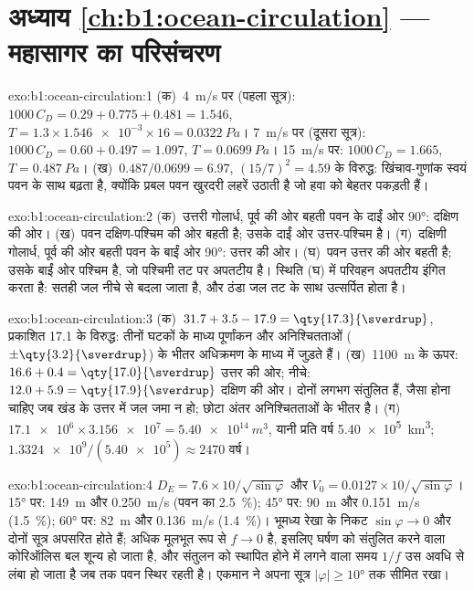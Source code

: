 \section*{अध्याय \ref{ch:b1:ocean-circulation} --- महासागर का परिसंचरण}

\begin{solution}{exo:b1:ocean-circulation:1}
(क)~\qty{4}{m/s} पर (पहला सूत्र): $1000\,C_D = 0.29 + 0.775 + 0.481 = 1.546$,
$T = 1.3 \times \num{1.546e-3} \times 16 = \qty{0.0322}{Pa}$। \qty{7}{m/s} पर (दूसरा सूत्र): $1000\,C_D = 0.60 + 0.497 = 1.097$, $T = \qty{0.0699}{Pa}$। \qty{15}{m/s} पर: $1000\,C_D = 1.665$, $T = \qty{0.487}{Pa}$। (ख)~$0.487/0.0699 =
6.97$, $(15/7)^2 = 4.59$ के विरुद्ध: खिंचाव-गुणांक स्वयं पवन के साथ बढ़ता है, क्योंकि प्रबल पवन खुरदरी लहरें उठाती है जो हवा को बेहतर पकड़ती हैं।
\end{solution}

\begin{solution}{exo:b1:ocean-circulation:2}
(क)~उत्तरी गोलार्ध, पूर्व की ओर बहती पवन के दाईं ओर \ang{90}: दक्षिण की ओर। (ख)~पवन दक्षिण-पश्चिम की ओर बहती है; उसके दाईं ओर उत्तर-पश्चिम है। (ग)~दक्षिणी गोलार्ध, पूर्व की ओर बहती पवन के बाईं ओर \ang{90}: उत्तर की ओर। (घ)~पवन उत्तर की ओर बहती है; उसके बाईं ओर पश्चिम है, जो पश्चिमी तट पर अपतटीय है। स्थिति (घ) में परिवहन अपतटीय इंगित करता है: सतही जल नीचे से बदला जाता है, और ठंडा जल तट के साथ उत्सर्पित होता है।
\end{solution}

\begin{solution}{exo:b1:ocean-circulation:3}
(क)~$31.7 + 3.5 - 17.9 = \qty{17.3}{\sverdrup}$, प्रकाशित \qty{17.1}{\sverdrup} के विरुद्ध: तीनों घटकों के माध्य पूर्णांकन और अनिश्चितताओं ($\pm\qty{3.2}{\sverdrup}$) के भीतर अधिक्रमण के माध्य में जुड़ते हैं। (ख)~\qty{1100}{m} के ऊपर: $16.6 + 0.4 = \qty{17.0}{\sverdrup}$ उत्तर की ओर; नीचे: $12.0 + 5.9 = \qty{17.9}{\sverdrup}$ दक्षिण की ओर। दोनों लगभग संतुलित हैं, जैसा होना चाहिए जब खंड के उत्तर में जल जमा न हो; छोटा अंतर अनिश्चितताओं के भीतर है। (ग)~$\num{17.1e6} \times \num{3.156e7} = \qty{5.40e14}{m^3}$, यानी प्रति वर्ष \qty{5.40e5}{km^3}; $\num{1.3324e9}/(\num{5.40e5}) \approx 2470$ वर्ष।
\end{solution}

\begin{solution}{exo:b1:ocean-circulation:4}
$D_E = 7.6 \times 10/\sqrt{\sin\varphi}$ और $V_0 = 0.0127 \times
10/\sqrt{\sin\varphi}$। \ang{15} पर: \qty{149}{m} और \qty{0.250}{m/s}
(पवन का \qty{2.5}{\percent}); \ang{45} पर: \qty{90}{m} और \qty{0.151}{m/s}
(\qty{1.5}{\percent}); \ang{60} पर: \qty{82}{m} और \qty{0.136}{m/s}
(\qty{1.4}{\percent})। भूमध्य रेखा के निकट $\sin\varphi \to 0$ और दोनों सूत्र अपसरित होते हैं; अधिक मूलभूत रूप से $f \to 0$ है, इसलिए घर्षण को संतुलित करने वाला कोरिऑलिस बल शून्य हो जाता है, और संतुलन को स्थापित होने में लगने वाला समय $1/f$ उस अवधि से लंबा हो जाता है जब तक पवन स्थिर रहती है। एकमान ने अपना सूत्र $|\varphi| \geq
\ang{10}$ तक सीमित रखा।
\end{solution}

